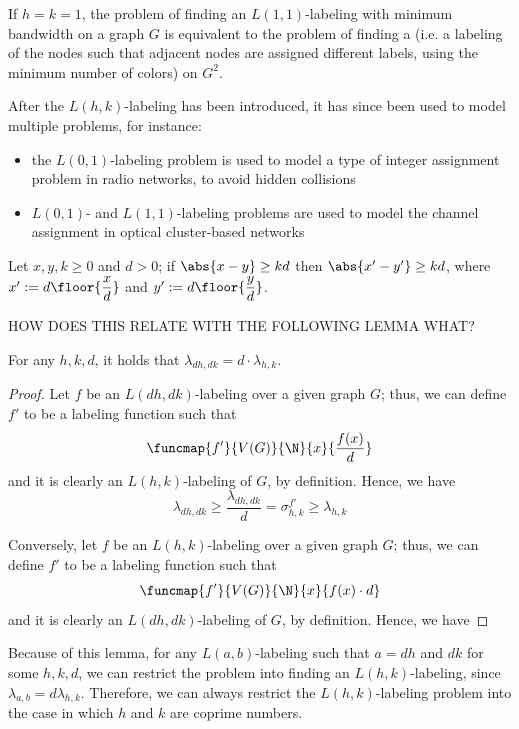 \documentclass[a4paper, 12pt]{report}
\begin{document}
    If $h = k = 1$, the problem of finding an $L(1, 1)$-labeling with minimum bandwidth on a graph $G$ is equivalent to the problem of finding a  (i.e. a labeling of the nodes such that adjacent nodes are assigned different labels, using the minimum number of colors) on $G^2$.

    After the $L(h, k)$-labeling has been introduced, it has since been used to model multiple problems, for instance:

    \begin{itemize}
        \item the $L(0, 1)$-labeling problem is used to model a type of integer  assignment problem in radio networks, to avoid hidden collisions
        \item $L(0, 1)$- and $L(1,1)$-labeling problems are used to model the channel assignment in optical cluster-based networks
    \end{itemize}

    \begin{framedlem}{}
        Let $x, y, k \ge 0$ and $d > 0$; if $\abs{ x- y} \ge kd$ then $\abs{x' - y'} \ge kd$, where $x' := d \floor{\dfrac{x}{d}}$ and $y' := d \floor{\dfrac{y}{d}}$.
    \end{framedlem}

    HOW DOES THIS RELATE WITH THE FOLLOWING LEMMA WHAT? 

    \begin{framedlem}{}
        For any $h, k, d$, it holds that $\lambda_{dh, dk} = d \cdot \lambda_{h, k}$.
    \end{framedlem}

    \begin{proof}
        Let $f$ be an $L(dh, dk)$-labeling over a given graph $G$; thus, we can define $f'$ to be a labeling function such that $$\funcmap{f'}{V(G)}{\N}{x}{\dfrac{f(x)}{d}}$$ and it is clearly an $L(h, k)$-labeling of $G$, by definition. Hence, we have  $$\lambda_{dh, dk} \ge \dfrac{\lambda_{dh, dk}}{d} = \sigma_{h, k}^{f'} \ge \lambda_{h, k}$$

        Conversely, let $f$ be an $L(h, k)$-labeling over a given graph $G$; thus, we can define $f'$ to be a labeling function such that $$\funcmap{f'}{V(G)}{\N}{x}{f(x) \cdot d}$$ and it is clearly an $L(dh, dk)$-labeling of $G$, by definition. Hence, we have 
    \end{proof}

    Because of this lemma, for any $L(a, b)$-labeling such that $a = dh$ and $dk$ for some $h, k, d$, we can restrict the problem into finding an $L(h, k)$-labeling, since $\lambda_{a, b} = d \lambda_{h, k}$. Therefore, we can always restrict the $L(h, k)$-labeling problem into the case in which $h$ and $k$ are coprime numbers.
\end{document}

